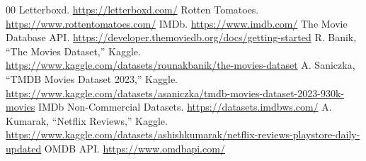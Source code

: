 \documentclass[conference]{IEEEtran}
\begin{document}
\vspace{4pt}

\begin{thebibliography}{00}
 Letterboxd. \url{https://letterboxd.com/}
 Rotten Tomatoes. \url{https://www.rottentomatoes.com/}
 IMDb. \url{https://www.imdb.com/}
 The Movie Database API. \url{https://developer.themoviedb.org/docs/getting-started}
 R. Banik, ``The Movies Dataset,'' Kaggle. \url{https://www.kaggle.com/datasets/rounakbanik/the-movies-dataset}
 A. Saniczka, ``TMDB Movies Dataset 2023,'' Kaggle. \url{https://www.kaggle.com/datasets/asaniczka/tmdb-movies-dataset-2023-930k-movies}
 IMDb Non-Commercial Datasets. \url{https://datasets.imdbws.com/}
 A. Kumarak, ``Netflix Reviews,'' Kaggle. \url{https://www.kaggle.com/datasets/ashishkumarak/netflix-reviews-playstore-daily-updated}
 OMDB API. \url{https://www.omdbapi.com/}
\end{thebibliography}
\end{document}
